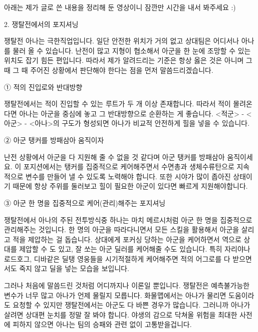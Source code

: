 아래는 제가 글로 쓴 내용을 정리해 둔 영상이니 잠깐만 시간을 내서 봐주세요 :)




2. 쟁탈전에서의 포지셔닝
 

쟁탈전 아나는 극한직업입니다. 일단 안전한 위치가 거의 없고 상대팀은 어디서나 아나를 물러 올 수 있습니다. 난전이 많고 지형이 협소해서 아군을 한 눈에 조망할 수 있는 위치도 잡기 힘든 편입니다. 따라서 제가 알려드리는 기준은 항상 옳은 것은 아니며 그 때 그 때 주어진 상황에서 판단해야 한다는 점을 먼저 말씀드리겠습니다.

 

① 적의 진입로와 반대방향

쟁탈전에서는 적이 진입할 수 있는 루트가 두 개 이상 존재합니다. 따라서 적이 몰려온다면 아나는 아군을 중심에 놓고 그 반대방향으로 순환하는 게 좋습니다. <적군> - <아군> - <아나>의 구도가 형성되면 아나가 비교적 안전하게 힐을 넣을 수 있습니다.

 

② 아군 탱커를 방패삼아 움직이자

난전 상황에서 아군을 다 지원해 줄 수 없을 것 같다며 아군 탱커를 방패삼아 움직이세요. 이 포지션에서는 탱커를 집중적으로 케어해주면서 수면총과 생체수류탄으로 지속적으로 변수를 만들어 낼 수 있도록 노력해야 합니다. 또한 시야가 많이 좁아진 상태이기 때문에 항상 주위를 둘러보고 힐이 필요한 아군이 있다면 빠르게 지원해야합니다.

 

③ 아군 한 명을 집중적으로 케어(관리)해주는 포지셔닝

쟁탈전에서 아나의 주된 전투방식중 하나는 마치 메르시처럼 아군 한 명을 집중적으로 관리해주는 것입니다. 한 명의 아군을 따라다니면서 모든 스킬을 활용해서 아군을 살리고 적을 제압하는 걸 돕습니다. 상대에게 포커싱 당하는 아군을 케어하면서 역으로 상대를 제압할 수 도 있고, 잘 쏘는 아군 딜러를 케어해줄 수도 있습니다. 특히 자리야나 로드호그, 디바같은 딜탱 영웅들을 시기적절하게 케어해주면 적의 어그로를 다 받으면서도 죽지 않고 딜을 넣는 모습을 보입니다.

 

그러나 처음에 말씀드린 것처럼 어디까지나 이론일 뿐입니다. 쟁탈전은 예측불가능한 변수가 너무 많고 아나가 언제 물릴지 모릅니다. 화물맵에서는 아나가 물리면 도움이라도 요청할 수 있지만 쟁탈전에서는 아군도 다 바쁜 경우가 많습니다. 그러니까 아나가 살려면 상대편 눈치를 정말 잘 봐야 합니다. 야생의 감으로 닥쳐올 위험을 최대한 사전에 피하지 않으면 아나는 팀의 승패와 관련 없이 고통받을겁니다.

 

 

